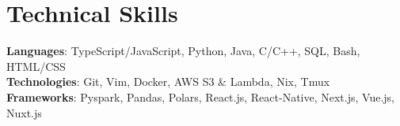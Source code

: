 \section{Technical Skills}
\begin{itemize}[leftmargin=0.15in, label={}]
	\small{\item{
	      \textbf{Languages}{: TypeScript/JavaScript, Python, Java, C/C++, SQL, Bash, HTML/CSS } \\
        \textbf{Technologies}{: Git, Vim, Docker, AWS S3 \& Lambda, Nix, Tmux } \\
        \textbf{Frameworks}{: Pyspark, Pandas, Polars, React.js, React-Native, Next.js, Vue.js, Nuxt.js}}}
\end{itemize}
